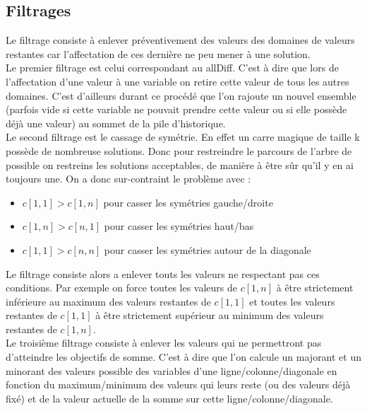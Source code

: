 \documentclass[12pt,a4paper]{article}
\begin{document}
\subsection{Filtrages}

Le filtrage consiste à enlever préventivement des valeurs des domaines de valeurs restantes car l'affectation de ces dernière ne peu mener à une solution.\\

Le premier filtrage est celui correspondant au allDiff. C'est à dire que lors de l'affectation d'une valeur à une variable on retire cette valeur de tous les autres domaines. C'est d’ailleurs durant ce procédé que l'on rajoute un nouvel ensemble (parfois vide si cette variable ne pouvait prendre cette valeur ou si elle possède déjà une valeur) au sommet de la pile d'historique.\\

Le second filtrage est le cassage de symétrie. En effet un carre magique de taille k possède de nombreuse solutions. Donc pour restreindre le parcours de l'arbre de possible on restreins les solutions acceptables, de manière à être sûr qu'il y en ai toujours une. On a donc sur-contraint le problème avec :
\begin{itemize}
\item
$c\left[1,1\right] > c\left[1,n\right]$ pour casser les symétries gauche/droite
\item
$c\left[1,n\right] > c\left[n,1\right]$ pour casser les symétries haut/bas
\item
$c\left[1,1\right] > c\left[n,n\right]$ pour casser les symétries autour de la diagonale
\end{itemize}
Le filtrage consiste alors a enlever touts les valeurs ne respectant pas ces conditions. Par exemple on force toutes les valeurs de $c\left[1,n\right]$ à être strictement inférieure au maximum des valeurs restantes de $c\left[1,1\right]$ et toutes les valeurs restantes de $c\left[1,1\right]$ à être strictement supérieur au minimum des valeurs restantes de $c\left[1,n\right]$.\\

Le troisième filtrage consiste à enlever les valeurs qui ne permettront pas d’atteindre les objectifs de somme. C'est à dire que l'on calcule un majorant et un minorant des valeurs possible des variables d'une ligne/colonne/diagonale en fonction du maximum/minimum des valeurs qui leurs reste (ou des valeurs déjà fixé) et de la valeur actuelle de la somme sur cette ligne/colonne/diagonale.\\
\end{document}
